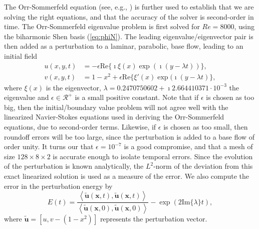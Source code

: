 \documentclass[preprint]{elsarticle}
\begin{document}
The Orr-Sommerfeld equation (see, e.g., \cite{Orszag_1971}) is further used to establish that we are solving the right equations, and that the accuracy of the solver is second-order in time. The Orr-Sommerfeld eigenvalue problem is first solved for $Re=8000$, using the biharmonic Shen basis (\ref{eq:phiN}). The leading eigenvalue/eigenvector pair is then added as a perturbation to a laminar, parabolic, base flow, leading to an initial field
\begin{align}
u(x,y,t) &= -\epsilon  \mathrm{Re}\{\imath \xi(x) \exp (\imath (y-\lambda t))\}, \label{eq:OS1} \\
v(x,y,t) &= 1-x^2 + \epsilon \mathrm{Re}\{\xi'(x) \exp(\imath(y-\lambda t)\}, \label{eq:OS2}
\end{align}
where $\xi(x)$ is the eigenvector, $\lambda=0.2470750602+\imath 2.664410371\cdot 10^{-3}$ the eigenvalue and $\epsilon \in \mathcal{R}^+$ is a small positive constant. Note that if $\epsilon$ is chosen as too big, then the initial/boundary value problem will not agree well with the linearized Navier-Stokes equations used in deriving the Orr-Sommerfeld equations, due to second-order terms. Likewise, if $\epsilon$ is chosen as too small, then roundoff errors will be too large, since the perturbation is added to a base flow of order unity. It turns our that $\epsilon=10^{-7}$ is a good compromise, and that a mesh of size $128 \times 8 \times 2$ is accurate enough to isolate temporal errors. Since the evolution of the perturbation is known analytically, the $L^2$-norm of the deviation from this exact linearized solution is used as a measure of the error. We also compute the error in the perturbation energy by
\begin{equation}
E(t) =  \frac{\left<\tilde{\bm{u}}(\bm{x}, t), \tilde{\bm{u}}(\bm{x}, t) \right>}{\left<\tilde{\bm{u}}(\bm{x}, 0), \tilde{\bm{u}}(\bm{x}, 0) \right>}  - \exp(2 \mathrm{Im}\{\lambda\}t), \label{eq:OSenergy}
\end{equation}
where $\tilde{\bm{u}} = [u, v-(1-x^2)]$ represents the perturbation vector. 
\end{document}
